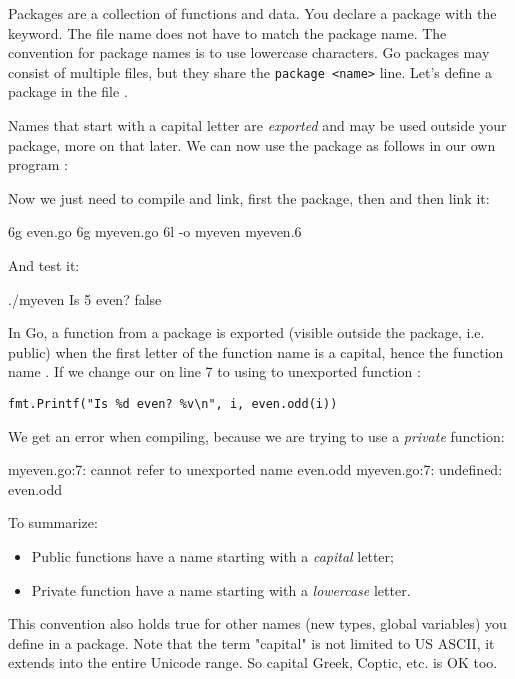 \noindent{}Packages are a collection of functions and data. 
You declare a package with the
 keyword. The file name does not
have to match the package name.
The convention for package names is to use
lowercase characters.
Go packages may consist of multiple files,
but they share the \lstinline{package <name>} line.
Let's define a package  in the file .


Names that start with a capital letter are \emph{exported} and may be used
outside your package, more on that later. We can now use
the package as follows in our own program :


\showremarks

Now we just need to compile and link, first the package, then  and
then link it:
\begin{display}
\pr 6g even.go			
\pr 6g myeven.go		
\pr 6l -o myeven myeven.6       
\end{display}
And test it:
\begin{display}
\pr ./myeven
Is 5 even? false
\end{display}

In Go, a function from a package is exported (visible
outside the package, i.e. public) when the first letter of the function name is a capital, hence
the function name . If we change our  on line
7 to using to unexported function :

\noindent\lstinline{fmt.Printf("Is %d even? %v\n", i, even.odd(i))}

We get an error when compiling, because we are trying to use a
\emph{private} function:
\begin{display}
myeven.go:7: cannot refer to unexported name even.odd
myeven.go:7: undefined: even.odd
\end{display}

\noindent{}To summarize:
\begin{itemize}
\item Public functions have a name starting with a \emph{capital}
letter;
\item Private function have a name starting with a \emph{lowercase} letter.
\end{itemize}
This convention also holds true for other names (new types, global
variables) you define in a package. Note that the term "capital" is not limited
to US ASCII, it extends into the entire Unicode range. So capital Greek, Coptic, etc. is OK too.

